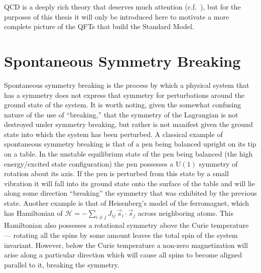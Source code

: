 QCD is a deeply rich theory that deserves much attention (c.f.~\cite{Campbell:2017hsr}), but for the purposes of this thesis it will only be introduced here to motivate a more complete picture of the QFTs that build the Standard Model.

\section{Spontaneous Symmetry Breaking}\label{section:symmetry_breaking}

Spontaneous symmetry breaking is the process by which a physical system that has a symmetry does not express that symmetry for perturbations around the ground state of the system.
It is worth noting, given the somewhat confusing nature of the use of ``breaking,'' that the symmetry of the Lagrangian is not destroyed under symmetry breaking, but rather is not manifest given the ground state into which the system has been perturbed.
A classical example of spontaneous symmetry breaking is that of a pen being balanced upright on its tip on a table.
In the unstable equilibrium state of the pen being balanced (the high energy/excited state configuration) the pen possesses a $\mathrm{U}(1)$ symmetry of rotation about its axis.
If the pen is perturbed from this state by a small vibration it will fall into its ground state onto the surface of the table and will lie along some direction ``breaking'' the symmetry that was exhibited by the previous state.
Another example is that of Heisenberg’s model of the ferromagnet, which has Hamiltonian of $\mathcal{H} = -\sum_{i\neq j} J_{ij}\,\vec{s}_{i} \cdot \vec{s}_{j}$ across neighboring atoms.
This Hamiltonian also possesses a rotational symmetry above the Curie temperature --- rotating all the spins by some amount leaves the total spin of the system invariant.
However, below the Curie temperature a non-zero magnetization will arise along a particular direction which will cause all spins to become aligned parallel to it, breaking the symmetry.

